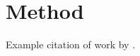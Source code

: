 \section{Method}
\label{sect:method}

Example citation of  work by \cite{feraru_towards_2020}.

\lipsum[2-4]